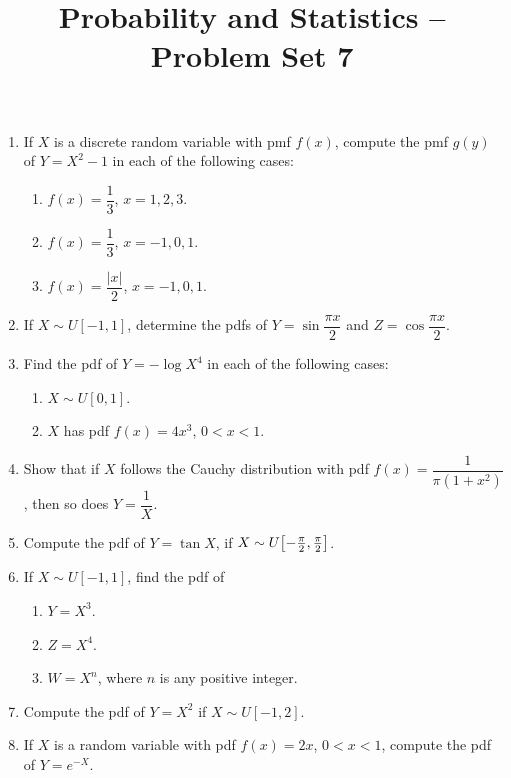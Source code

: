 \documentclass[svgnames]{amsart}
\title[]{Probability and Statistics -- Problem Set 7}
\begin{document}
\maketitle
\begin{enumerate}[leftmargin=*, itemsep=0.3em]
\item If $X$ is a discrete random variable with pmf $f(x)$, compute the pmf $g(y)$ of $Y = X^2 - 1$ in each of the following cases:
\begin{enumerate}[itemsep=5pt]
    \item $f(x) = \dfrac 1 3$, $x = 1, 2, 3$.
    \item $f(x) = \dfrac 1 3$, $x = -1, 0, 1$.
    \item $f(x) = \dfrac{|x|}{2}$, $x = -1, 0, 1$.
\end{enumerate}

\item If $X \sim U[-1, 1]$, determine the pdfs of $Y = \sin \dfrac{\pi x}{2}$ and $Z = \cos \dfrac{\pi x}{2}$.

\item Find the pdf of $Y = - \log X^4$ in each of the following cases:
\begin{enumerate}
\item $X \sim U[0, 1]$.
\item $X$ has pdf $f(x) = 4x^3$, $0 < x < 1$.
\end{enumerate}

\item Show that if $X$ follows the Cauchy distribution with pdf $f(x) = \dfrac{1}{\pi (1 + x^2)}$, then so does $Y = \dfrac 1 X$.

\item Compute the pdf of $Y = \tan X$, if $X \sim U\bqty{-\frac \pi 2, \frac \pi 2}$.

\item If $X \sim U[-1, 1]$, find the pdf of
\begin{enumerate}
\item $Y = X^3$.
\item $Z = X^4$.
\item $W = X^n$, where $n$ is any positive integer.
\end{enumerate}

\item Compute the pdf of $Y = X^2$ if $X \sim U[-1, 2]$.

\item If $X$ is a random variable with pdf $f(x) = 2x$, $0 < x < 1$, compute the pdf of $Y = e^{-X}$.


\end{enumerate}
\end{document}
